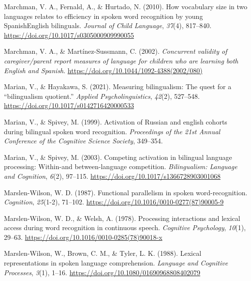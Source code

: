 \documentclass[
  12pt,
  b5paperpaper,
  twoside]{scrreprt}
\newlength{\cslhangindent}
\newlength{\cslentryspacingunit} %
\newenvironment{CSLReferences}[2] %
 {%
  \setlength{\parindent}{0pt}
  \ifodd #1
  \let\oldpar\par
  \def\par{\hangindent=\cslhangindent\oldpar}
  \fi
  \setlength{\parskip}{#2\cslentryspacingunit}
 }%
 {}
\begin{document}
\begin{CSLReferences}{1}{0}
\leavevmode{}%
Marchman, V. A., Fernald, A., \& Hurtado, N. (2010). How vocabulary size
in two languages relates to efficiency in spoken word recognition by
young {Spanish}{\textendash}{English} bilinguals. \emph{Journal of Child
Language}, \emph{37}(4), 817--840.
\url{https://doi.org/10.1017/s0305000909990055}

\leavevmode{}%
Marchman, V. A., \& Martínez-Sussmann, C. (2002). \emph{Concurrent
validity of caregiver/parent report measures of language for children
who are learning both {English} and {Spanish}}.
\url{https://doi.org/10.1044/1092-4388(2002/080)}

\leavevmode{}%
Marian, V., \& Hayakawa, S. (2021). Measuring bilingualism: The quest
for a {``bilingualism quotient.''} \emph{Applied Psycholinguistics},
\emph{42}(2), 527--548. \url{https://doi.org/10.1017/s0142716420000533}

\leavevmode{}%
Marian, V., \& Spivey, M. (1999). Activation of {Russian} and english
cohorts during bilingual spoken word recognition. \emph{Proceedings of
the 21st {Annual Conference} of the {Cognitive Science Society}},
349--354.

\leavevmode{}%
Marian, V., \& Spivey, M. (2003). Competing activation in bilingual
language processing: Within-and between-language competition.
\emph{Bilingualism: Language and Cognition}, \emph{6}(2), 97--115.
\url{https://doi.org/10.1017/s1366728903001068}

\leavevmode{}%
Marslen-Wilson, W. D. (1987). Functional parallelism in spoken
word-recognition. \emph{Cognition}, \emph{25}(1-2), 71--102.
\url{https://doi.org/10.1016/0010-0277(87)90005-9}

\leavevmode{}%
Marslen-Wilson, W. D., \& Welsh, A. (1978). Processing interactions and
lexical access during word recognition in continuous speech.
\emph{Cognitive Psychology}, \emph{10}(1), 29--63.
\url{https://doi.org/10.1016/0010-0285(78)90018-x}

\leavevmode{}%
Marslen-Wilson, W., Brown, C. M., \& Tyler, L. K. (1988). Lexical
representations in spoken language comprehension. \emph{Language and
Cognitive Processes}, \emph{3}(1), 1--16.
\url{https://doi.org/10.1080/01690968808402079}


\end{CSLReferences}
\end{document}
